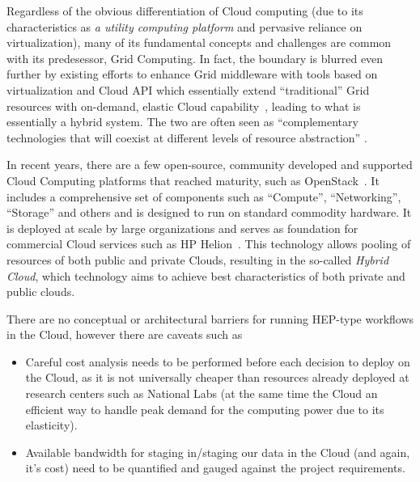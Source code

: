 Regardless of the obvious differentiation of Cloud computing (due to its characteristics as \textit{a utility computing platform} and pervasive reliance on virtualization),
many of its fundamental concepts and challenges are common with its predesessor, Grid Computing. In fact, the boundary is blurred even further by existing efforts to
enhance Grid middleware with tools based on virtualization and Cloud API which essentially extend ``traditional'' Grid resources with on-demand, elastic Cloud
capability~\cite{star_acat11}, leading to what is essentially a hybrid system. The two are often seen as ``complementary technologies that will coexist at
different levels of resource abstraction'' \cite{atlas_cloud_chep13}.

In recent years, there are a few open-source, community developed and supported Cloud Computing platforms that reached maturity, such as OpenStack~\cite{openstack}.
It includes a comprehensive set of components such as ``Compute'', ``Networking'', ``Storage'' and others and is designed to run on standard commodity hardware.
It is deployed at scale by large organizations and serves as foundation for commercial Cloud services such as HP Helion~\cite{helion}. This technology allows pooling
of resources of both public and private Clouds, resulting in the so-called \textit{Hybrid Cloud}, which technology aims to achieve best characteristics of both private
and public clouds.

There are no conceptual or architectural barriers for running HEP-type workflows in the Cloud, however there are caveats such as
\begin{itemize}

\item Careful cost analysis needs to be performed before each decision to deploy on the Cloud, as it is not universally cheaper than
resources already deployed at research centers such as National Labs (at the same time the Cloud an efficient way to handle peak demand
for the computing power due to its elasticity).

\item Available bandwidth for staging in/staging our data in the Cloud (and again, it's cost) need to be quantified and gauged against the project requirements.

\end{itemize}

 


%

